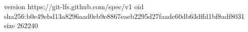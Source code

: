 version https://git-lfs.github.com/spec/v1
oid sha256:b0e49ebd13a8296aad0eb9e8867eaeb2295d27faade60db63dffd1bf8adf8031
size 262240
